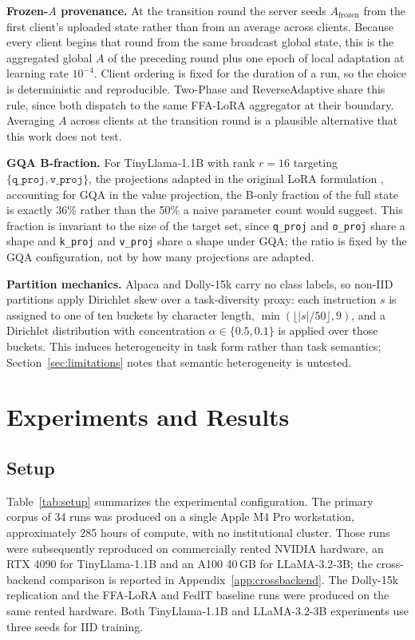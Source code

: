 \textbf{Frozen-$A$ provenance.} At the transition round the server seeds $A_{\text{frozen}}$ from the first client's uploaded state rather than from an average across clients. Because every client begins that round from the same broadcast global state, this is the aggregated global $A$ of the preceding round plus one epoch of local adaptation at learning rate $10^{-4}$. Client ordering is fixed for the duration of a run, so the choice is deterministic and reproducible. Two-Phase and ReverseAdaptive share this rule, since both dispatch to the same FFA-LoRA aggregator at their boundary. Averaging $A$ across clients at the transition round is a plausible alternative that this work does not test.

\textbf{GQA B-fraction.}
For TinyLlama-1.1B with rank $r{=}16$ targeting $\{\texttt{q\_proj}, \texttt{v\_proj}\}$, the projections adapted in the original LoRA formulation \citep{hu2022lora}, accounting for GQA in the value projection, the B-only fraction of the full state is exactly 36\% rather than the 50\% a naive parameter count would suggest. This fraction is invariant to the size of the target set, since \texttt{q\_proj} and \texttt{o\_proj} share a shape and \texttt{k\_proj} and \texttt{v\_proj} share a shape under GQA; the ratio is fixed by the GQA configuration, not by how many projections are adapted.

\textbf{Partition mechanics.}
Alpaca and Dolly-15k carry no class labels, so non-IID partitions apply Dirichlet skew over a task-diversity proxy: each instruction $s$ is assigned to one of ten buckets by character length, $\min(\lfloor |s| / 50 \rfloor, 9)$, and a Dirichlet distribution with concentration $\alpha \in \{0.5, 0.1\}$ is applied over those buckets. This induces heterogeneity in task form rather than task semantics; Section~\ref{sec:limitations} notes that semantic heterogeneity is untested.

\section{Experiments and Results}
\label{sec:experiments}

\subsection{Setup}
\label{sec:setup}
Table~\ref{tab:setup} summarizes the experimental configuration. The primary corpus of 34 runs was produced on a single Apple M4 Pro workstation, approximately 285 hours of compute, with no institutional cluster. Those runs were subsequently reproduced on commercially rented NVIDIA hardware, an RTX 4090 for TinyLlama-1.1B and an A100 40\,GB for LLaMA-3.2-3B; the cross-backend comparison is reported in Appendix~\ref{app:crossbackend}. The Dolly-15k replication and the FFA-LoRA and FedIT baseline runs were produced on the same rented hardware. Both TinyLlama-1.1B and LLaMA-3.2-3B experiments use three seeds for IID training.

